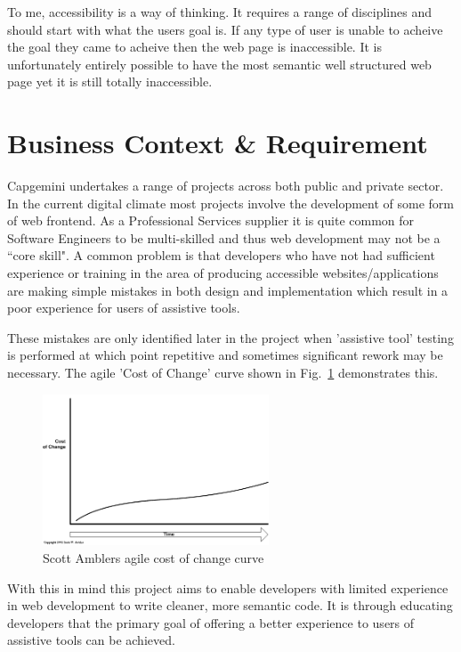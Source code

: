 To me, accessibility is a way of thinking. It requires a range of disciplines
and should start with what the users goal is. If any type of user is unable to
acheive the goal they came to acheive then the web page is inaccessible. It
is unfortunately entirely possible to have the most semantic well
structured web page yet it is still totally inaccessible.

\section{Business Context \& Requirement}
Capgemini undertakes a range of projects across both public and private
sector. In the current digital climate most projects involve the
development of some form of web frontend. As a Professional Services supplier it
is quite common for Software Engineers to be multi-skilled and thus web
development may not be a ``core skill". A common problem is that developers
who have not had sufficient experience or training in the area of producing
accessible websites/applications are making simple mistakes in both design and
implementation which result in a poor experience for users of assistive tools.

These mistakes are only identified later in the project when
'assistive tool' testing is performed at which point repetitive and sometimes
significant rework may be necessary. The agile 'Cost of Change' \citep{CostOfChange} curve
shown in Fig.~\ref{fig:costOfChange} demonstrates this.

\begin{figure}[H]
\centering
\includegraphics[width=0.6\textwidth]{figures/costOfChange}
\captionsetup{justification=centering}
\caption{Scott Amblers agile cost of change curve
\label{fig:costOfChange}}
\end{figure}

With this in mind this project aims to enable developers with limited
experience in web development to write cleaner, more semantic code. It is
through educating developers that the primary goal of offering a better
experience to users of assistive tools can be achieved.



